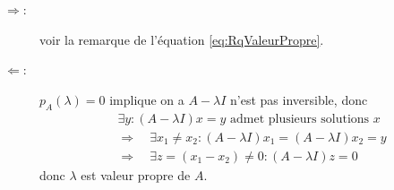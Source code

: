 \proof 
  \begin{description}
    \item[$\Rightarrow$:] voir la remarque de l'équation \eqref{eq:RqValeurPropre}.
    \item[$\Leftarrow$:] $p_A(\lambda) = 0$ implique on a $A - \lambda I$ n'est pas inversible, donc
      \begin{align*}
        & \exists y: (A - \lambda I)x = y \text{ admet plusieurs solutions $x$} \\
        & \Rightarrow \quad \exists x_1 \neq x_2: (A - \lambda I)x_1 = (A - \lambda I)x_2 = y \\
        & \Rightarrow \quad \exists z = (x_1 - x_2) \neq 0: (A - \lambda I)z = 0 
      \end{align*} 
      donc $\lambda$ est valeur propre de $A$. 
  \end{description}
\eproof

